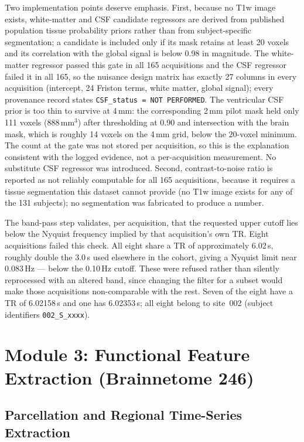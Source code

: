 \documentclass{ssnreview}
\begin{document}
Two implementation points deserve emphasis. First, because no T1w image exists,
white-matter and CSF candidate regressors are derived from published population
tissue probability priors rather than from subject-specific segmentation; a candidate
is included only if its mask retains at least 20 voxels and its correlation with the
global signal is below 0.98 in magnitude. The white-matter regressor passed this gate
in all 165 acquisitions and the CSF regressor failed it in all 165, so the nuisance
design matrix has exactly 27 columns in every acquisition (intercept, 24 Friston
terms, white matter, global signal); every provenance record states
\texttt{CSF\_status = NOT PERFORMED}. The ventricular CSF prior is too thin to survive
at 4\,mm: the corresponding 2\,mm pilot mask held only 111 voxels (888\,mm$^3$)
after thresholding at 0.90 and intersection with the brain mask, which is roughly 14
voxels on the 4\,mm grid, below the 20-voxel minimum. The count at the gate was not stored per acquisition, so this is the explanation
consistent with the logged evidence, not a per-acquisition measurement. No substitute CSF
regressor was introduced. Second, contrast-to-noise ratio is reported as not reliably
computable for all 165 acquisitions, because it requires a tissue segmentation this
dataset cannot provide (no T1w image exists for any of the 131 subjects); no
segmentation was fabricated to produce a number.

The band-pass step validates, per acquisition, that the requested upper cutoff lies
below the Nyquist frequency implied by that acquisition's own TR. Eight acquisitions
failed this check. All eight share a TR of approximately 6.02\,s, roughly double the
3.0\,s used elsewhere in the cohort, giving a Nyquist limit near 0.083\,Hz --- below
the 0.10\,Hz cutoff. These were refused rather than silently reprocessed with an
altered band, since changing the filter for a subset would make those acquisitions
non-comparable with the rest. Seven of the eight have a TR of 6.02158\,s and one has
6.02353\,s; all eight belong to site~002 (subject identifiers \texttt{002\_S\_xxxx}).

\section{Module 3: Functional Feature Extraction (Brainnetome 246)}

\subsection{Parcellation and Regional Time-Series Extraction}
\end{document}
